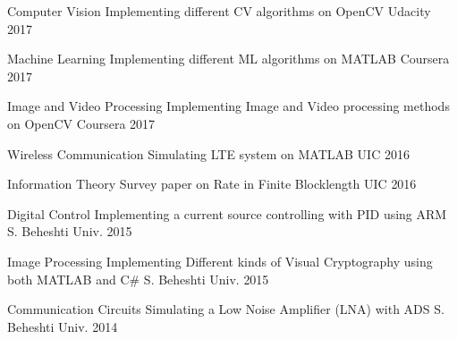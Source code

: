 

\begin{cvhonors}

  \cvhonor
    {Computer Vision} %
    {Implementing different CV algorithms on OpenCV} %
    {Udacity} %
    {2017} %
    
  \cvhonor
    {Machine Learning} %
    {Implementing different ML algorithms on MATLAB} %
    {Coursera} %
    {2017} %
    
    
  \cvhonor
    {Image and Video Processing} %
    {Implementing Image and Video processing methods on OpenCV} %
    {Coursera} %
    {2017} %

  \cvhonor
    {Wireless Communication} %
    {Simulating LTE system on MATLAB} %
    {UIC} %
    {2016} %

  \cvhonor
    {Information Theory} %
    {Survey paper on Rate in Finite Blocklength} %
    {UIC} %
    {2016} %


  \cvhonor
    {Digital Control} %
    {Implementing a current source controlling with PID using ARM} %
    {S. Beheshti Univ.} %
    {2015} %


  \cvhonor
    {Image Processing} %
    {Implementing Different kinds of Visual Cryptography using both MATLAB and C\#} %
    {S. Beheshti Univ.} %
    {2015} %




  \cvhonor
    {Communication Circuits} %
    {Simulating a Low Noise Amplifier (LNA) with ADS} %
    {S. Beheshti Univ.} %
    {2014} %



\end{cvhonors}
